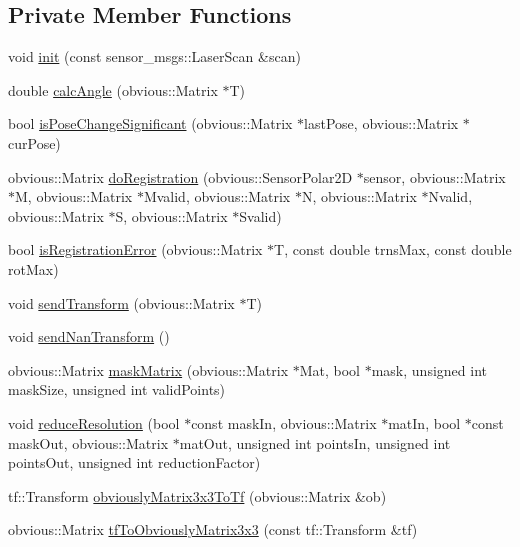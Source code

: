 \subsection*{Private Member Functions}
\begin{DoxyCompactItemize}
\item 
void \hyperlink{classohm__tsd__slam__ref_1_1ThreadLocalize_aec7ad646c46fd6809d7606d02388d26f}{init} (const sensor\-\_\-msgs\-::\-Laser\-Scan \&scan)
\item 
double \hyperlink{classohm__tsd__slam__ref_1_1ThreadLocalize_a2f2f07578bdc28b9d217f79b8d37e2b6}{calc\-Angle} (obvious\-::\-Matrix $\ast$T)
\item 
bool \hyperlink{classohm__tsd__slam__ref_1_1ThreadLocalize_a42b20cc96002fb42347aa292a8321589}{is\-Pose\-Change\-Significant} (obvious\-::\-Matrix $\ast$last\-Pose, obvious\-::\-Matrix $\ast$cur\-Pose)
\item 
obvious\-::\-Matrix \hyperlink{classohm__tsd__slam__ref_1_1ThreadLocalize_a0b89c7cf90db8719b2324cce13b43e5b}{do\-Registration} (obvious\-::\-Sensor\-Polar2\-D $\ast$sensor, obvious\-::\-Matrix $\ast$M, obvious\-::\-Matrix $\ast$Mvalid, obvious\-::\-Matrix $\ast$N, obvious\-::\-Matrix $\ast$Nvalid, obvious\-::\-Matrix $\ast$S, obvious\-::\-Matrix $\ast$Svalid)
\item 
bool \hyperlink{classohm__tsd__slam__ref_1_1ThreadLocalize_a9b03610d7b3f56c24c733e2cc1f922bc}{is\-Registration\-Error} (obvious\-::\-Matrix $\ast$T, const double trns\-Max, const double rot\-Max)
\item 
void \hyperlink{classohm__tsd__slam__ref_1_1ThreadLocalize_a7e09fab6884bb9752525a5b9a3223f48}{send\-Transform} (obvious\-::\-Matrix $\ast$T)
\item 
void \hyperlink{classohm__tsd__slam__ref_1_1ThreadLocalize_a3b98400814080c99c6cf5d6513b85b8d}{send\-Nan\-Transform} ()
\item 
obvious\-::\-Matrix \hyperlink{classohm__tsd__slam__ref_1_1ThreadLocalize_a8b5b655705c1c06398b725d37815084b}{mask\-Matrix} (obvious\-::\-Matrix $\ast$Mat, bool $\ast$mask, unsigned int mask\-Size, unsigned int valid\-Points)
\item 
void \hyperlink{classohm__tsd__slam__ref_1_1ThreadLocalize_a9ebe616b6e1af232d3663ea7ba8af19e}{reduce\-Resolution} (bool $\ast$const mask\-In, obvious\-::\-Matrix $\ast$mat\-In, bool $\ast$const mask\-Out, obvious\-::\-Matrix $\ast$mat\-Out, unsigned int points\-In, unsigned int points\-Out, unsigned int reduction\-Factor)
\item 
tf\-::\-Transform \hyperlink{classohm__tsd__slam__ref_1_1ThreadLocalize_acc11e43687732ffe8c81dfbeb293a6bc}{obviously\-Matrix3x3\-To\-Tf} (obvious\-::\-Matrix \&ob)
\item 
obvious\-::\-Matrix \hyperlink{classohm__tsd__slam__ref_1_1ThreadLocalize_aad3131cd2ef3eb0de3e79ed0d58a4190}{tf\-To\-Obviously\-Matrix3x3} (const tf\-::\-Transform \&tf)
\end{DoxyCompactItemize}
